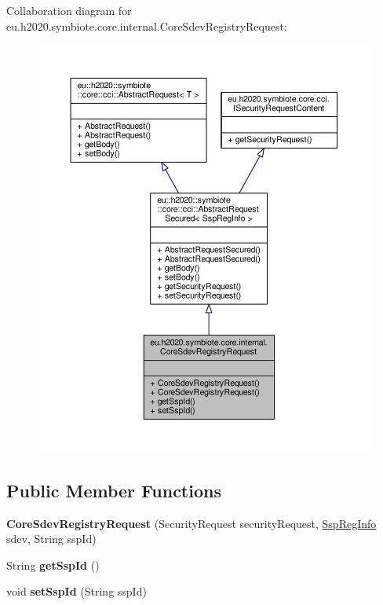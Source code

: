 Collaboration diagram for eu.\+h2020.\+symbiote.\+core.\+internal.\+Core\+Sdev\+Registry\+Request\+:\nopagebreak
\begin{figure}[H]
\begin{center}
\leavevmode
\includegraphics[width=350pt]{classeu_1_1h2020_1_1symbiote_1_1core_1_1internal_1_1CoreSdevRegistryRequest__coll__graph}
\end{center}
\end{figure}
\subsection*{Public Member Functions}
\begin{DoxyCompactItemize}
\item 
\mbox{\label{classeu_1_1h2020_1_1symbiote_1_1core_1_1internal_1_1CoreSdevRegistryRequest_a3f711d443180992467ca9919400f3496}} 
{\bfseries Core\+Sdev\+Registry\+Request} (Security\+Request security\+Request, \hyperlink{classeu_1_1h2020_1_1symbiote_1_1cloud_1_1model_1_1ssp_1_1SspRegInfo}{Ssp\+Reg\+Info} sdev, String ssp\+Id)
\item 
\mbox{\label{classeu_1_1h2020_1_1symbiote_1_1core_1_1internal_1_1CoreSdevRegistryRequest_abd85ea3e91e1f637cf5453c9922e9717}} 
String {\bfseries get\+Ssp\+Id} ()
\item 
\mbox{\label{classeu_1_1h2020_1_1symbiote_1_1core_1_1internal_1_1CoreSdevRegistryRequest_a1c919a350d8ba920a4f500db6267e40d}} 
void {\bfseries set\+Ssp\+Id} (String ssp\+Id)
\end{DoxyCompactItemize}


